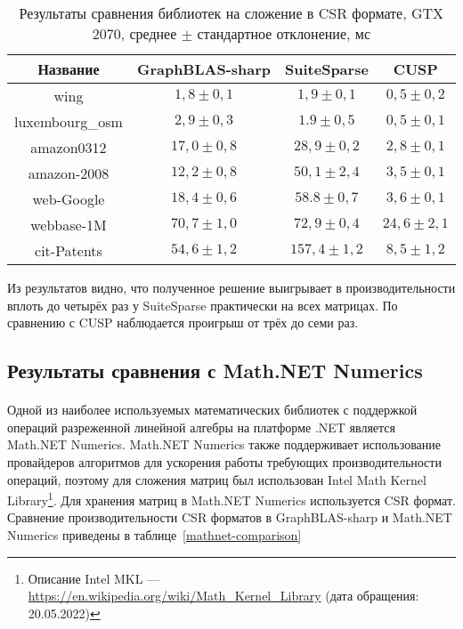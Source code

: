 \documentclass[14pt]{matmex-diploma-custom}
\begin{document}
\begin{table}
\centering
\begin{tabular}{|c||c|c|c|}
\hline
Название            & GraphBLAS-sharp & SuiteSparse & CUSP        \\
\hline
\hline
wing            & $1,8 \pm 0,1$      & $1,9\pm 0,1$   & $0,5\pm 0,2$   \\
\hline
luxembourg\_osm & $2,9 \pm 0,3$      & $1.9\pm 0,5$   & $0,5\pm 0,1$   \\
\hline
amazon0312      & $17,0 \pm 0,8$      & $28,9\pm 0,2$  & $2,8\pm 0,1$   \\
\hline
amazon-2008     & $12,2 \pm 0,8$     & $50,1\pm 2,4$  & $3,5\pm 0,1$   \\
\hline
web-Google      & $18,4 \pm 0,6$     & $58.8\pm 0,7$  & $3,6\pm 0,1$   \\
\hline
webbase-1M      & $70,7 \pm 1,0$      & $72,9\pm 0,4$  & $24,6\pm 2,1$  \\
\hline
cit-Patents     & $54,6 \pm 1,2$      & $157,4\pm 1,2$ & $8,5\pm 1,2$   \\     
\hline
\end{tabular}
\caption{Результаты сравнения библиотек на сложение в CSR формате, GTX 2070, среднее $\pm$ стандартное отклонение, мс}
\label{platform-comparison}
\end{table}

Из результатов видно, что полученное решение выигрывает в производительности вплоть до четырёх раз у SuiteSparse практически на всех матрицах. По сравнению с CUSP наблюдается проигрыш от трёх до семи раз.

\subsection{Результаты сравнения с Math.NET Numerics}
\paragraph{}Одной из наиболее используемых математических библиотек с поддержкой операций разреженной линейной алгебры на платформе .NET является Math.NET Numerics. Math.NET Numerics также поддерживает использование провайдеров алгоритмов для ускорения работы требующих производительности операций, поэтому для сложения матриц был использован Intel Math Kernel Library\footnote{Описание Intel MKL --- \url{https://en.wikipedia.org/wiki/Math_Kernel_Library} (дата обращения: 20.05.2022)}. Для хранения матриц в Math.NET Numerics используется CSR формат. Сравнение производительности CSR форматов в GraphBLAS-sharp и Math.NET Numerics приведены в таблице~\ref{mathnet-comparison}
\end{document}
